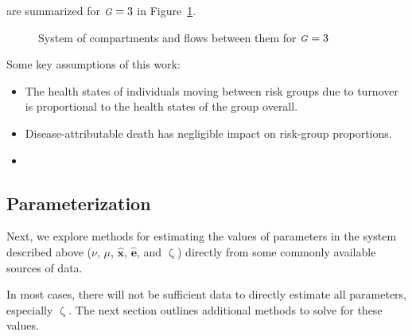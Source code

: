 \documentclass[10pt]{article}
\numberwithin{equation}{section}
\renewcommand{\zeta}{\upzeta}
\newcommand{\G}{{\mbox{\footnotesize{\textit{G}}}}}
\begin{document}
are summarized for $\G = 3$ in Figure~\ref{fig:system}.
\begin{figure}[h]
  \centering
  \caption{System of compartments and flows between them for $\G = 3$}
  \label{fig:system}
\end{figure}
\par
Some key assumptions of this work:
\begin{itemize}
  \item The health states of individuals moving between risk groups due to turnover
  is proportional to the health states of the group overall.
  \item Disease-attributable death has negligible impact on risk-group proportions.
  \item 
\end{itemize}
\subsection{Parameterization}\label{ss:params}
Next, we explore methods for estimating the values of parameters
in the system described above
($\nu$, $\mu$, $\bm{\hat{x}}$, $\bm{\hat{e}}$, and $\zeta$)
directly from some commonly available sources of data.
\par
In most cases, there will not be sufficient data to directly estimate all parameters,
especially $\zeta$.
The next section outlines additional methods to solve for these values.
\end{document}
